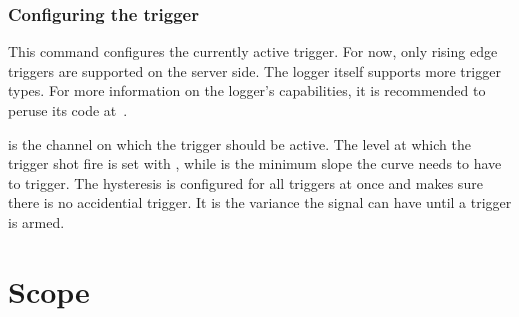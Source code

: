 \subsection{Configuring the trigger} %
\label{subsec:devguide:server:configuring_trigger}

This command  configures the currently  active trigger.  For now,  only rising
edge triggers  are supported  on the server  side. The logger  itself supports
more trigger types. For  more information on the logger's  capabilities, it is
recommended to peruse its code at~\cite{pita:github:huesser:zynq-logger}.

 is the channel on which the trigger should be active. The level
at which the trigger shot fire is set with , while  is
the  minimum slope  the  curve needs  to have  to  trigger. The hysteresis  is
configured for  all triggers at  once and makes  sure there is  no accidential
trigger. It is the variance the signal can have until a trigger is armed.


%
%
\chapter{Scope} %
\label{ch:devguide:scope}


